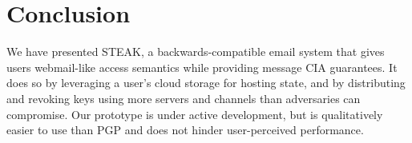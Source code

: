 \section{Conclusion}

We have presented STEAK, a backwards-compatible email system that gives users 
webmail-like access semantics while providing message CIA guarantees.  It does so
by leveraging a user's cloud storage for hosting state, and by distributing and revoking
keys using more servers and channels than adversaries can compromise.  Our prototype
is under active development, but is qualitatively easier to use than PGP and does 
not hinder user-perceived performance.
